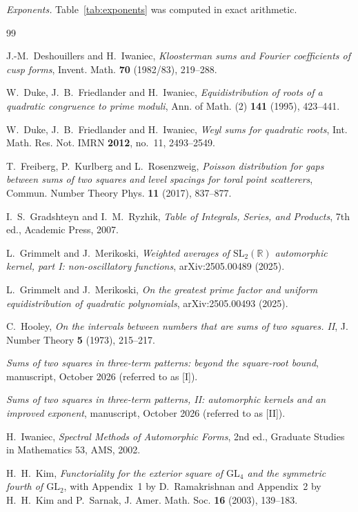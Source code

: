 \documentclass[11pt]{amsart}
\theoremstyle{remark}
\theoremstyle{definition}
\numberwithin{equation}{section}
\begin{document}
\emph{Exponents.} Table~\ref{tab:exponents} was computed in exact arithmetic.

\begin{thebibliography}{99}

 J.-M.~Deshouillers and H.~Iwaniec, \emph{Kloosterman sums and Fourier coefficients of cusp forms}, Invent. Math. \textbf{70} (1982/83), 219--288.

 W.~Duke, J.~B.~Friedlander and H.~Iwaniec, \emph{Equidistribution of roots of a quadratic congruence to prime moduli}, Ann. of Math. (2) \textbf{141} (1995), 423--441.

 W.~Duke, J.~B.~Friedlander and H.~Iwaniec, \emph{Weyl sums for quadratic roots}, Int. Math. Res. Not. IMRN \textbf{2012}, no.~11, 2493--2549.

 T.~Freiberg, P.~Kurlberg and L.~Rosenzweig, \emph{Poisson distribution for gaps between sums of two squares and level spacings for toral point scatterers}, Commun. Number Theory Phys. \textbf{11} (2017), 837--877.

 I.~S.~Gradshteyn and I.~M.~Ryzhik, \emph{Table of Integrals, Series, and Products}, 7th ed., Academic Press, 2007.

 L.~Grimmelt and J.~Merikoski, \emph{Weighted averages of $\mathrm{SL}_2(\mathbb R)$ automorphic kernel, part I: non-oscillatory functions}, arXiv:2505.00489 (2025).

 L.~Grimmelt and J.~Merikoski, \emph{On the greatest prime factor and uniform equidistribution of quadratic polynomials}, arXiv:2505.00493 (2025).

 C.~Hooley, \emph{On the intervals between numbers that are sums of two squares. II}, J. Number Theory \textbf{5} (1973), 215--217.

 \emph{Sums of two squares in three-term patterns: beyond the square-root bound}, manuscript, October 2026 (referred to as [I]).

 \emph{Sums of two squares in three-term patterns, II: automorphic kernels and an improved exponent}, manuscript, October 2026 (referred to as [II]).

 H.~Iwaniec, \emph{Spectral Methods of Automorphic Forms}, 2nd ed., Graduate Studies in Mathematics 53, AMS, 2002.

 H.~H.~Kim, \emph{Functoriality for the exterior square of $\mathrm{GL}_4$ and the symmetric fourth of $\mathrm{GL}_2$}, with Appendix~1 by D.~Ramakrishnan and Appendix~2 by H.~H.~Kim and P.~Sarnak, J. Amer. Math. Soc. \textbf{16} (2003), 139--183.


\end{thebibliography}
\end{document}
